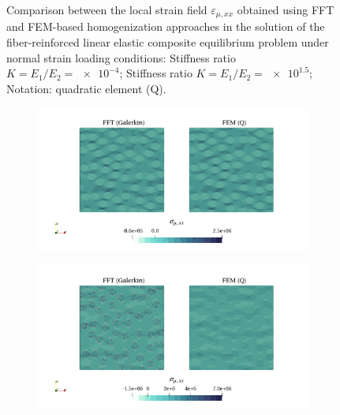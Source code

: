 \begin{figure}[hbt]
\begin{subfigure}[b]{\textwidth}
    \caption{}
    \label{subfig:linear_2D_ratio_4_normal_strain_11}
  \end{subfigure}
  \caption{Comparison between the local strain field \(\varepsilon_{\mu,xx}\) obtained using
  FFT and FEM-based homogenization approaches in the solution of the fiber-reinforced
  linear elastic composite equilibrium problem under normal strain loading conditions:
   Stiffness ratio \(K=E_1/E_2=\num{e-4}\);
   Stiffness ratio \(K=E_1/E_2=\num{e1.5}\);
  Notation: quadratic element (Q).}
\label{fig:linear_2D_stiff_contrast_normal_strain_11}
\end{figure}

\begin{figure}[hbt]
  \centering
	\begin{subfigure}[b]{\textwidth}
    \centering
    \includegraphics[width=\textwidth]{figures/linear_2D_ratio_-4_normal_stress_11}
    \caption{}
    \label{subfig:linear_2D_ratio_4_normal_stress_11}
  \end{subfigure}
  \begin{subfigure}[b]{\textwidth}
    \centering
    \includegraphics[width=\textwidth]{figures/linear_2D_ratio_4_normal_stress_11}

\end{subfigure}
\end{figure}

